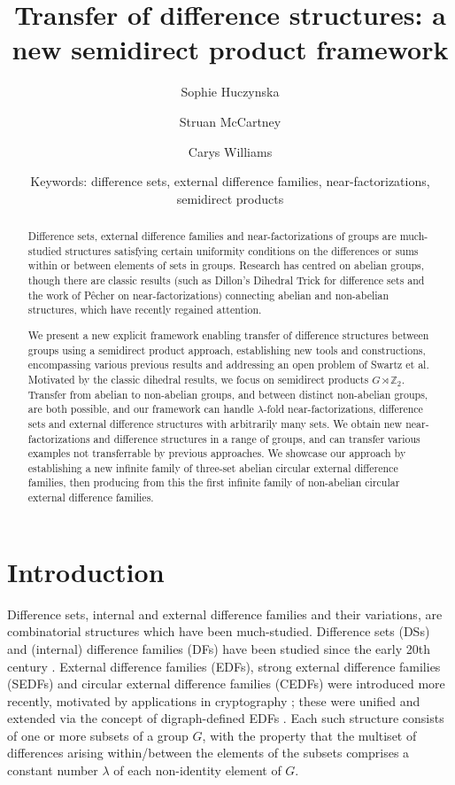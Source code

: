 \documentclass[12pt, a4paper]{article}
\title{Transfer of difference structures: a new semidirect product framework}
\author[1] {Sophie Huczynska}
\author[2] {Struan McCartney}
\author[3] {Carys Williams}
\affil[1,2,3]{School of Mathematics and Statistics, University of St Andrews, St Andrews, KY16 9SS, Scotland, UK; email:(SH) sh70@st-andrews.ac.uk, (SM) sm444@st-andrews.ac.uk}
\date{\small Keywords: difference sets, external difference families, near-factorizations, semidirect products}
\theoremstyle{definition}
\begin{document}
\maketitle

\begin{abstract}
Difference sets, external difference families and near-factorizations of groups are much-studied structures satisfying certain uniformity conditions on the differences or sums within or between elements of sets in groups.  Research has centred on abelian groups, though there are classic results (such as Dillon's Dihedral Trick for difference sets and the work of P\^{e}cher on near-factorizations) connecting abelian and non-abelian structures, which have recently regained attention.

We present a new explicit framework enabling transfer of difference structures between groups using a semidirect product approach, establishing new tools and constructions, encompassing various previous results and addressing an open problem of Swartz et al.  Motivated by the classic dihedral results, we focus on semidirect products $G \rtimes \mathbb{Z}_2$.  Transfer from abelian to non-abelian groups, and between distinct non-abelian groups, are both possible, and our framework can handle $\lambda$-fold near-factorizations, difference sets and external difference structures with arbitrarily many sets.  We obtain new near-factorizations and difference structures in a range of groups, and can transfer various examples not transferrable by previous approaches. We showcase our approach by establishing a new infinite family of three-set abelian circular external difference families, then producing from this the first infinite family of non-abelian circular external difference families.  
\end{abstract}


\section{Introduction}
Difference sets, internal and external difference families and their variations, are combinatorial structures which have been much-studied.  Difference sets (DSs) and (internal) difference families (DFs) have been studied since the early 20th century \cite{hand}.  External difference families (EDFs), strong external difference families (SEDFs) and circular external difference families (CEDFs) were introduced more recently, motivated by applications in cryptography \cite{HucJefMcC, PatSti, StiVei}; these were  unified and extended via the concept of digraph-defined EDFs \cite{HucJefMcC}.  Each such structure consists of one or more subsets of a group $G$, with the property that the multiset of differences arising within/between the elements of the subsets comprises a constant number $\lambda$ of each non-identity element of $G$. 
\end{document}
